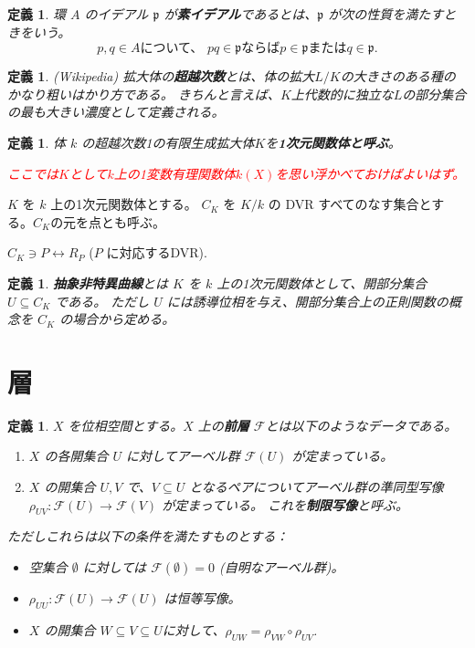 \documentclass[uplatex]{jsreport}
\newtheorem{dfn}[thm]{定義}
\newcommand{\mfp}{\mathfrak{p}}
\newcommand{\mcF}{\mathcal{F}}
\begin{document}
\begin{dfn}
    環 $A$ のイデアル $\mfp$ が\textbf{素イデアル}であるとは、$\mfp$ が次の性質を満たすときをいう。
    \[
        p, q \in A \text{について、\ } pq \in \mfp \text{ならば} p \in \mfp \text{または} q \in \mfp.
    \]
\end{dfn}

\begin{dfn}
    (Wikipedia) 拡大体の{\bf 超越次数}とは、体の拡大$L/K$の大きさのある種のかなり粗いはかり方である。
    きちんと言えば、$K$上代数的に独立な$L$の部分集合の最も大きい濃度として定義される。
\end{dfn}

\begin{dfn}
体 $k$ の超越次数1の有限生成拡大体$K$を{\bf 1次元関数体と呼ぶ}。

\textcolor{red}{ここでは$K$として$k$上の1変数有理関数体$k(X)$を思い浮かべておけばよいはず。}
\end{dfn}

$K$ を $k$ 上の1次元関数体とする。
$C_K$ を $K/k$ の DVR すべてのなす集合とする。$C_K$の元を点とも呼ぶ。
\begin{center}
    $C_K \ni P \leftrightarrow R_P$ ($P$ に対応するDVR).
\end{center}

\begin{dfn}
    {\bf 抽象非特異曲線}とは $K$ を $k$ 上の1次元関数体として、開部分集合 $U \subseteq C_K$ である。
    ただし $U$ には誘導位相を与え、開部分集合上の正則関数の概念を $C_K$ の場合から定める。
\end{dfn}

\section{層}

\begin{dfn}
    $X$ を位相空間とする。$X$ 上の\textbf{前層} $\mcF$とは以下のようなデータである。
    \begin{enumerate}
        \item $X$ の各開集合 $U$ に対してアーベル群 $\mcF(U)$ が定まっている。
        \item $X$ の開集合 $U, V$ で、$V \subseteq U$ となるペアについてアーベル群の準同型写像
        $\rho_{UV}: \mcF(U) \to \mcF(V)$ が定まっている。 これを\textbf{制限写像}と呼ぶ。
    \end{enumerate}
    ただしこれらは以下の条件を満たすものとする：
    \begin{itemize}
        \item 空集合 $\emptyset$ に対しては $\mcF(\emptyset) = 0$ (自明なアーベル群)。
        \item $\rho_{UU}: \mcF(U) \to \mcF(U)$ は恒等写像。
        \item $X$ の開集合 $W \subseteq V \subseteq U$に対して、$\rho_{UW} = \rho_{VW}\circ\rho_{UV}$.
    \end{itemize}
\end{dfn}
\end{document}
